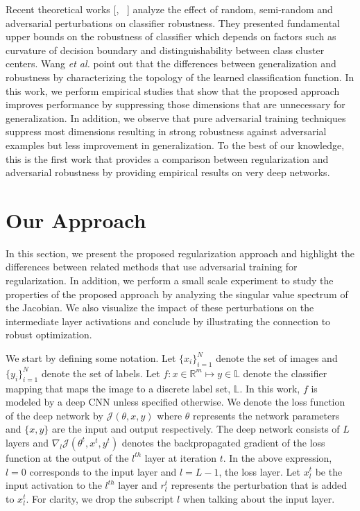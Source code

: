 \documentclass[letterpaper]{article} %
\begin{document}
Recent theoretical works [\cite{fawzi2015analysis}, ~\cite{fawzi2016robustness}] analyze the effect of random, semi-random and adversarial perturbations on classifier robustness. They presented fundamental upper bounds on the robustness of classifier which depends on factors such as curvature of decision boundary and distinguishability between class cluster centers. Wang \emph{et al.} \cite{WangGQ16} point out that the differences between generalization and robustness by characterizing the topology of the learned classification function. In this work, we perform empirical studies that show that the proposed approach improves performance by suppressing those dimensions that are unnecessary for generalization. In addition, we observe that pure adversarial training techniques suppress most dimensions resulting in strong robustness against adversarial examples but less improvement in generalization. To the best of our knowledge, this is the first work that provides a comparison between regularization and adversarial robustness by providing empirical results on very deep networks.



\section{Our Approach}\label{sec:method}
In this section, we present the proposed regularization approach and highlight the  differences between related methods that use adversarial training for regularization. In addition, we perform a small scale experiment to study the properties of the proposed approach by analyzing the singular value spectrum of the Jacobian. We also visualize the impact of these perturbations on the intermediate layer activations and conclude by illustrating the connection to robust optimization.

We start by defining some notation. Let $\{x_i\}_{i=1}^{N}$ denote the set of images and $\{y_i\}_{i=1}^{N}$ denote the set of labels. Let $f: x \in \mathbb{R}^{m} \mapsto y \in \mathbb{L}$ denote the classifier mapping that maps the image to a discrete label set, $\mathbb{L}$. In this work, $f$ is modeled by a deep CNN unless specified otherwise. We denote the loss function of the deep network by $\mathcal{J}(\theta,x,y)$ where $\theta$ represents the network parameters and $\{x,y\}$ are the input and output respectively. The deep network consists of $L$ layers and $\nabla_{l}\mathcal{J}(\theta^{t},x^{t},y^{t})$ denotes the backpropagated gradient of the loss function at the output of the ${l}^{th}$ layer at iteration $t$. In the above expression, $l=0$ corresponds to the input layer and $l=L-1$, the loss layer. Let $x^{t}_{l}$ be the input activation to the $l^{th}$ layer and $r^{t}_{l}$ represents the perturbation that is added to $x^{t}_{l}$. For clarity, we drop the subscript $l$ when talking about the input layer. %
\end{document}

